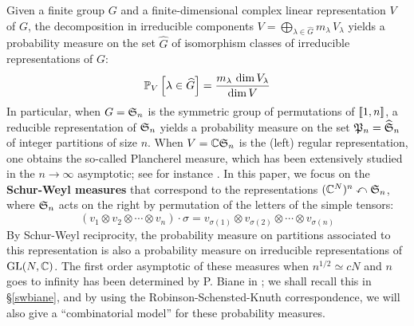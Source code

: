 \documentclass[10pt]{amsart}
\begin{document}
Given a finite group $G$ and a finite-dimensional complex linear representation $V$ of $G$, the decomposition in irreducible components $V=\bigoplus_{\lambda \in \widehat{G}}m_{\lambda}\,V_{\lambda}$ yields a probability measure on the set $\widehat{G}$ of isomorphism classes of irreducible representations of $G$:
$$\mathbb{P}_{V}\left[\lambda \in \widehat{G}\right]=\frac{m_{\lambda}\,\dim V_{\lambda}}{\dim V}$$
In particular, when $G=\mathfrak{S}_{n}$ is the symmetric group of permutations of $\left[\!\left[ 1,n\right]\!\right]$, a reducible representation of $\mathfrak{S}_{n}$ yields a probability measure on the set $\mathfrak{P}_{n}=\widehat{\mathfrak{S}}_{n}$ of integer partitions of size $n$. When $V=\mathbb{C}\mathfrak{S}_{n}$ is the (left) regular representation, one obtains the so-called Plancherel measure, which has been extensively studied in the $n \to \infty$ asymptotic; see for instance \cite{IO02}. In this paper, we focus on the \textbf{Schur-Weyl measures} that correspond to the representations $(\mathbb{C}^{N})^{n} \curvearrowleft \mathfrak{S}_{n}$, where $\mathfrak{S}_{n}$ acts on the right by permutation of the letters of the simple tensors:
$$(v_{1}\otimes v_{2}\otimes \cdots \otimes v_{n})\cdot \sigma = v_{\sigma(1)}\otimes v_{\sigma(2)} \otimes \cdots \otimes v_{\sigma(n)}$$
By Schur-Weyl reciprocity, the probability measure on partitions associated to this representation is also a probability measure on irreducible representations of $\mathrm{GL}(N,\mathbb{C})$. The first order asymptotic of these measures when $n^{1/2} \simeq cN$ and $n$ goes to infinity has been determined by P. Biane in \cite{Bia01}; we shall recall this in \S\ref{swbiane}, and by using the Robinson-Schensted-Knuth correspondence, we will also give a ``combinatorial model'' for these probability measures.\bigskip
\end{document}
